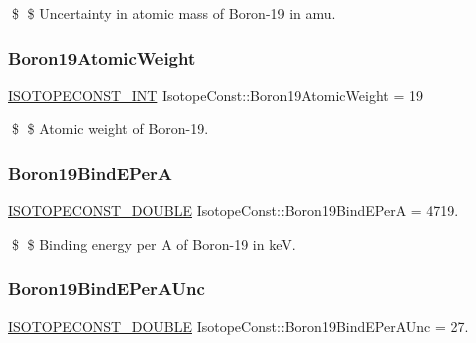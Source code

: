 \$ \$ Uncertainty in atomic mass of Boron-\/19 in amu. \mbox{\label{group___isotope_const-_boron-_b19_ga7289d24d5b59664534294a258ca83d09}} 
\subsubsection{\texorpdfstring{Boron19\+Atomic\+Weight}{Boron19AtomicWeight}}
{\footnotesize\ttfamily \mbox{\hyperlink{group___isotope_const-_macros_ga5f18360b3e99483a35c32d789e62621c}{I\+S\+O\+T\+O\+P\+E\+C\+O\+N\+S\+T\+\_\+\+I\+NT}} Isotope\+Const\+::\+Boron19\+Atomic\+Weight = 19}

\$ \$ Atomic weight of Boron-\/19. \mbox{\label{group___isotope_const-_boron-_b19_gaf437f8e384bcccde59b3bca467f81121}} 
\subsubsection{\texorpdfstring{Boron19\+Bind\+E\+PerA}{Boron19BindEPerA}}
{\footnotesize\ttfamily \mbox{\hyperlink{group___isotope_const-_macros_ga8f45a7272ce02c0b4c65c44636ed719a}{I\+S\+O\+T\+O\+P\+E\+C\+O\+N\+S\+T\+\_\+\+D\+O\+U\+B\+LE}} Isotope\+Const\+::\+Boron19\+Bind\+E\+PerA = 4719.}

\$ \$ Binding energy per A of Boron-\/19 in keV. \mbox{\label{group___isotope_const-_boron-_b19_ga57b0cc3806db515beaf36dedb1c44c64}} 
\subsubsection{\texorpdfstring{Boron19\+Bind\+E\+Per\+A\+Unc}{Boron19BindEPerAUnc}}
{\footnotesize\ttfamily \mbox{\hyperlink{group___isotope_const-_macros_ga8f45a7272ce02c0b4c65c44636ed719a}{I\+S\+O\+T\+O\+P\+E\+C\+O\+N\+S\+T\+\_\+\+D\+O\+U\+B\+LE}} Isotope\+Const\+::\+Boron19\+Bind\+E\+Per\+A\+Unc = 27.}

